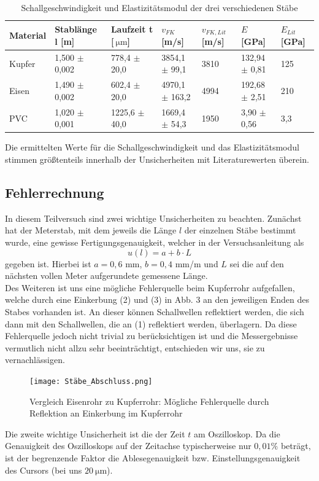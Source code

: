 \documentclass{article}
\begin{document}
\begin{table}[hbt!]
\caption{Schallgeschwindigkeit und Elastizitätsmodul der drei verschiedenen Stäbe}
\centering
\begin{tabular}{|l|l|l|l|l|l|l|}
\hline
\rule{0pt}{10pt}
Material & Stablänge l [m] & Laufzeit t [$\SI{}{\micro\meter}$] &  $v_{FK}$ [m/s] & $v_{FK,Lit}$ [m/s]&  $E$ [GPa] & $E_{Lit}$ [GPa] \\ \hline
Kupfer & 1,500 $\pm$ 0,002 & 778,4 $\pm$ 20,0  & 3854,1 $\pm$ 99,1 & 3810 &  132,94 $\pm$ 0,81 &   125              \\ \hline
Eisen & 1,490  $\pm$ 0,002 & 602,4 $\pm$ 20,0  & 4970,1 $\pm$ 163,2 & 4994 & 192,68 $\pm$ 2,51  &   210            \\ \hline
PVC & 1,020  $\pm$ 0,001 & 1225,6 $\pm$ 40,0 & 1669,4 $\pm$ 54,3 & 1950 &  3,90 $\pm$ 0,56 &   3,3            \\ \hline
\end{tabular}
\end{table}
Die ermittelten Werte für die Schallgeschwindigkeit und das Elastizitätsmodul stimmen größtenteils innerhalb der Unsicherheiten mit Literaturewerten \cite{2} \cite{3} \cite{5} überein.

\subsection{Fehlerrechnung}
In diesem Teilversuch sind zwei wichtige Unsicherheiten zu beachten.
Zunächst hat der Meterstab, mit dem jeweils die Länge $l$ der einzelnen Stäbe bestimmt wurde, eine gewisse Fertigungsgenauigkeit, welcher in der Versuchsanleitung \cite{1} als
\begin{equation}
u(l)= a + b \cdot L
\end{equation}
gegeben ist. Hierbei ist $a=0,6$ mm, $b=0,4$ mm/m und $L$ sei die auf den nächsten vollen Meter aufgerundete gemessene Länge.\\
Des Weiteren ist uns eine mögliche Fehlerquelle beim Kupferrohr aufgefallen, welche durch eine Einkerbung (2) und (3) in Abb. 3 an den jeweiligen Enden des Stabes vorhanden ist. An dieser können Schallwellen reflektiert werden, die sich dann mit den Schallwellen, die an (1) reflektiert werden, überlagern. Da diese Fehlerquelle jedoch nicht trivial zu berücksichtigen ist und die Messergebnisse vermutlich nicht allzu sehr beeinträchtigt, entschieden wir uns, sie zu vernachlässigen.
\begin{figure}
\centering
\texttt{[image: Stäbe\_Abschluss.png]}
\caption{Vergleich Eisenrohr zu Kupferrohr: Mögliche Fehlerquelle durch Reflektion an Einkerbung im Kupferrohr }
\end{figure}
Die zweite wichtige Unsicherheit ist die der Zeit $t$ am Oszilloskop. Da die Genauigkeit des Oszilloskops auf der Zeitachse typischerweise nur $0,01 \%$ \cite{1}  beträgt, ist der begrenzende Faktor die Ablesegenauigkeit bzw. Einstellungsgenauigkeit des Cursors (bei uns $\SI{20}{\micro\meter}$).
\end{document}
